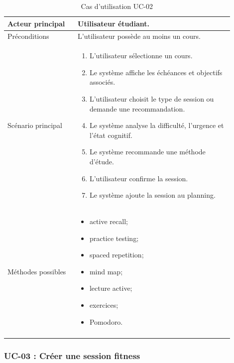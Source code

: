 \documentclass[12pt]{article}
\begin{document}
\begin{longtable}{|p{0.28\linewidth}|p{0.62\linewidth}|}
\hline
Acteur principal & Utilisateur étudiant. \\ \hline

Préconditions & L'utilisateur possède au moins un cours. \\ \hline

Scénario principal &
\begin{enumerate}[leftmargin=*]
    \item L'utilisateur sélectionne un cours.
    \item Le système affiche les échéances et objectifs associés.
    \item L'utilisateur choisit le type de session ou demande une recommandation.
    \item Le système analyse la difficulté, l'urgence et l'état cognitif.
    \item Le système recommande une méthode d'étude.
    \item L'utilisateur confirme la session.
    \item Le système ajoute la session au planning.
\end{enumerate}
\\ \hline

Méthodes possibles &
\begin{itemize}[leftmargin=*]
    \item active recall;
    \item practice testing;
    \item spaced repetition;
    \item mind map;
    \item lecture active;
    \item exercices;
    \item Pomodoro.
\end{itemize}
\\ \hline

\caption{Cas d'utilisation UC-02}
\label{tab:uc-02}
\end{longtable}

\subsubsection{UC-03 : Créer une session fitness}
\end{document}
